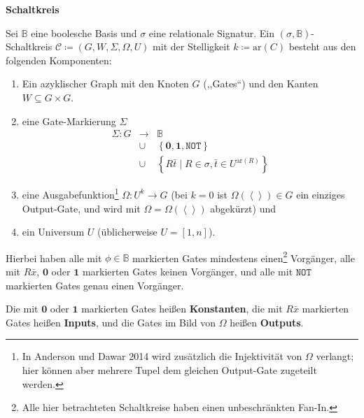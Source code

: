 \begin{defn}
\textbf{Schaltkreis}

Sei $\mathbb{B}$ eine boolesche Basis und $\sigma$ eine relationale
Signatur. Ein $\left(\sigma,\mathbb{B}\right)$-Schaltkreis $\mathcal{C}\coloneqq\left(G,W,\Sigma,\Omega,U\right)$
mit der Stelligkeit $k\coloneqq\mathrm{ar}\left(C\right)$ besteht
aus den folgenden Komponenten: 

\begin{enumerate}
\item Ein azyklischer Graph mit den Knoten $G$ (,,Gates``) und den Kanten
$W\subseteq G\times G$.
\item eine Gate-Markierung $\Sigma$ 
\begin{eqnarray*}
\Sigma:G & \rightarrow & \mathbb{B}\\
 & \cup & \left\{ \mathbf{0},\mathbf{1},\mathtt{NOT}\right\} \\
 & \cup & \left\{ R\bar{t}\mid R\in\sigma,\bar{t}\in U^{\mathrm{ar}\left(R\right)}\right\} 
\end{eqnarray*}
\item eine Ausgabefunktion\footnote{In Anderson und Dawar 2014\cite{AD2014} wird zusätzlich die Injektivität
von $\Omega$ verlangt; hier können aber mehrere Tupel dem gleichen
Output-Gate zugeteilt werden.} $\Omega:U^{k}\rightarrow G$ (bei $k=0$ ist $\Omega\left(\left\langle \right\rangle \right)\in G$
ein einziges Output-Gate, und wird mit $\Omega=\Omega\left(\left\langle \right\rangle \right)$
abgekürzt) und 
\item ein Universum $U$ (üblicherweise $U=\left[1,n\right]$).
\end{enumerate}
Hierbei haben alle mit $\phi\in\mathbb{B}$ markierten Gates mindestens
einen\footnote{Alle hier betrachteten Schaltkreise haben einen unbeschränkten Fan-In.}
Vorgänger, alle mit $R\bar{x}$, $\mathbf{0}$ oder $\mathbf{1}$
markierten Gates keinen\textbf{ }Vorgänger, und alle mit $\mathtt{NOT}$
markierten Gates genau\textbf{ }einen\textbf{ }Vorgänger.

Die mit $\mathbf{0}$ oder $\mathbf{1}$ markierten Gates heißen \textbf{Konstanten},
die mit $R\bar{x}$ markierten Gates heißen \textbf{Inputs}, und die
Gates im Bild von $\Omega$ heißen \textbf{Outputs}.
\end{defn}
%
